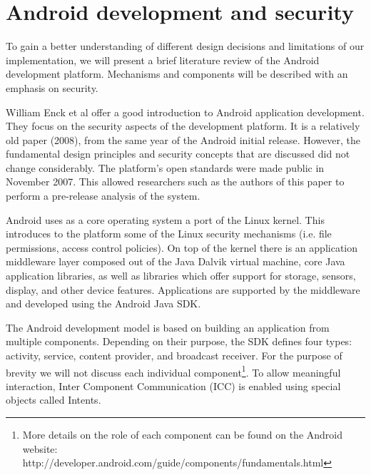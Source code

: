 
\chapter{Android development and security} %

\label{AppendixB} %


To gain a better understanding of different design decisions and limitations of our implementation, we will present a brief literature review of the Android development platform. Mechanisms and components will be described with an emphasis on security.

William Enck et al \cite{enck2009understanding} offer a good introduction to Android application development. They focus on the security aspects of the development platform. It is a relatively old paper (2008), from the same year of the Android initial release. However, the fundamental design principles and security concepts that are discussed did not change considerably. The platform's open standards were made public in November 2007. This allowed researchers such as the authors of this paper to perform a pre-release analysis of the system.

Android uses as a core operating system a port of the Linux kernel. This introduces to the platform some of the Linux security mechanisms (i.e. file permissions, access control policies). On top of the kernel there is an application middleware layer composed out of the Java Dalvik virtual machine, core Java application libraries, as well as libraries which offer support for storage, sensors, display, and other device features. Applications are supported by the middleware and developed using the Android Java SDK.

The Android development model is based on building an application from multiple components. Depending on their purpose, the SDK defines four types: activity, service, content provider, and broadcast receiver. For the purpose of brevity we will not discuss each individual component\footnote{More details on the role of each component can be found on the Android website: http://developer.android.com/guide/components/fundamentals.html}. To allow meaningful interaction, Inter Component Communication (ICC) is enabled using special objects called Intents.

